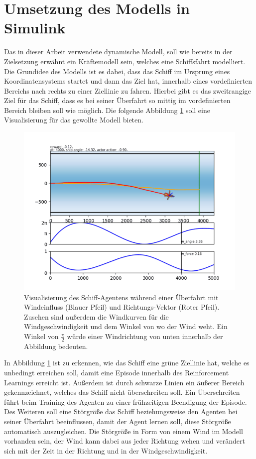 \documentclass[]{iat}
\begin{document}
\section{Umsetzung des Modells in Simulink} \label{sec:imp_simulink}
Das in dieser Arbeit verwendete dynamische Modell, soll wie bereits in der Zielsetzung erwähnt ein Kräftemodell sein, welches eine Schiffsfahrt modelliert. Die Grundidee des Modells ist es dabei, dass das Schiff im Ursprung eines Koordinatensystems startet und dann das Ziel hat, innerhalb eines vordefinierten Bereichs nach rechts zu einer Ziellinie zu fahren. Hierbei gibt es das zweitrangige Ziel für das Schiff, dass es bei seiner Überfahrt so mittig im vordefinierten Bereich bleiben soll wie möglich. Die folgende Abbildung \ref*{abb:boat_frame_example_2} soll eine Visualisierung für das gewollte Modell bieten.
\begin{figure}[H]
    \includegraphics[width=\textwidth]{graphics/boat_frame_example_2.png}
    \centering
    \caption{Visualisierung des Schiff-Agentens während einer Überfahrt mit Windeinfluss (Blauer Pfeil) und Richtungs-Vektor (Roter Pfeil). Zusehen sind außerdem die Windkurven für die Windgeschwindigkeit und dem Winkel von wo der Wind weht. Ein Winkel von $\frac{\pi}{2}$ würde einer Windrichtung von unten innerhalb der Abbildung bedeuten.}
    \label{abb:boat_frame_example_2}
\end{figure}
In Abbildung \ref*{abb:boat_frame_example_2} ist zu erkennen, wie das Schiff eine grüne Ziellinie hat, welche es unbedingt erreichen soll, damit eine Episode innerhalb des Reinforcement Learnings erreicht ist. Außerdem ist durch schwarze Linien ein äußerer Bereich gekennzeichnet, welches das Schiff nicht überschreiten soll. Ein Überschreiten führt beim Training des Agenten zu einer frühzeitigen Beendigung der Episode. Des Weiteren soll eine Störgröße das Schiff beziehungsweise den Agenten bei seiner Überfahrt beeinflussen, damit der Agent lernen soll, diese Störgröße automatisch auszugleichen. Die Störgröße in Form von einem Wind im Modell vorhanden sein, der Wind kann dabei aus jeder Richtung wehen und verändert sich mit der Zeit in der Richtung und in der Windgeschwindigkeit.\\
\end{document}
